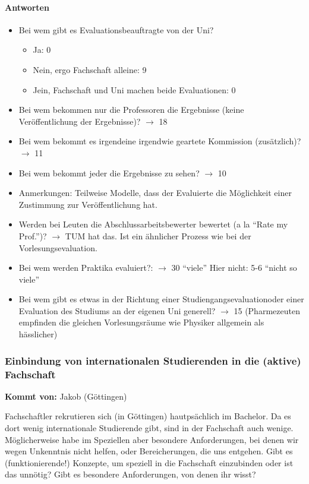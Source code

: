       \paragraph{Antworten}
        \begin{itemize}
          \item Bei wem gibt es Evaluationsbeauftragte von der Uni?
            \begin{itemize}
              \item Ja: 0
              \item Nein, ergo Fachschaft alleine: 9
              \item Jein, Fachschaft und Uni machen beide Evaluationen: 0
            \end{itemize}
          \item Bei wem bekommen nur die Professoren die Ergebnisse (keine Veröffentlichung der Ergebnisse)? $\rightarrow$ 18
          \item Bei wem bekommt es irgendeine irgendwie geartete Kommission (zusätzlich)? $\rightarrow$ 11
          \item Bei wem bekommt jeder die Ergebnisse zu sehen? $\rightarrow$ 10
          \item Anmerkungen: Teilweise Modelle, dass der Evaluierte die Möglichkeit einer Zustimmung zur Veröffentlichung hat.
          \item Werden bei Leuten die Abschlussarbeitsbewerter bewertet (a la “Rate my Prof.”)?
            $\rightarrow$ TUM hat das. Ist ein ähnlicher Prozess wie bei der Vorlesungsevaluation.
          \item Bei wem werden Praktika evaluiert?: $\rightarrow$ 30 “viele”
          Hier nicht: 5-6 “nicht so viele”
          \item Bei wem gibt es etwas in der Richtung einer \flqq Studiengangsevaluation\frqq oder einer Evaluation des Studiums an der eigenen Uni generell? $\rightarrow$ 15 (Pharmezeuten empfinden die gleichen Vorlesungsräume wie Physiker allgemein als hässlicher)
        \end{itemize}

    \subsubsection*{Einbindung von internationalen Studierenden in die (aktive) Fachschaft}
      \textbf{Kommt von:} Jakob (Göttingen)

      Fachschaftler rekrutieren sich (in Göttingen) hautpsächlich im Bachelor. Da es dort wenig internationale Studierende gibt, sind in der Fachschaft auch wenige. Möglicherweise habe im Speziellen aber besondere Anforderungen, bei denen wir wegen Unkenntnis nicht helfen, oder Bereicherungen, die uns entgehen. Gibt es (funktionierende!) Konzepte, um speziell in die Fachschaft einzubinden oder ist das unnötig?
      Gibt es besondere Anforderungen, von denen ihr wisst?

